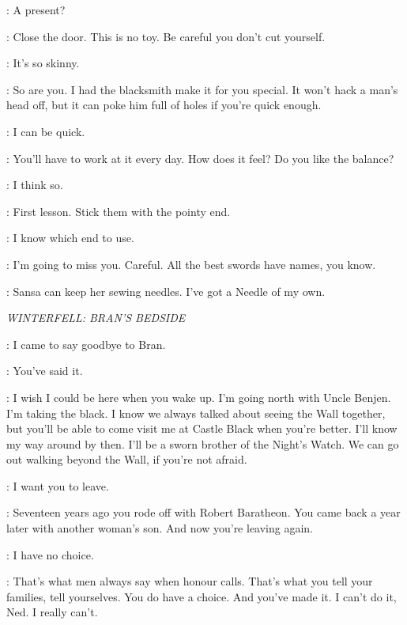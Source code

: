 \ARYA: A present? 

\JON: Close the door.  This is no toy. Be careful you don't cut yourself. 

\ARYA: It's so skinny. 

\JON: So are you. I had the blacksmith make it for you special. It won't hack a man's head off, but it can poke him full of holes if you're quick enough. 

\ARYA: I can be quick. 

\JON: You'll have to work at it every day. How does it feel? Do you like the balance? 

\ARYA: I think so. 

\JON: First lesson. Stick them with the pointy end. 

\ARYA: I know which end to use. 

\JON: I'm going to miss you.  Careful.  All the best swords have names, you know. 

\ARYA: Sansa can keep her sewing needles. I've got a Needle of my own. 

\scene

\textit{WINTERFELL: BRAN'S BEDSIDE}


\JON: I came to say goodbye to Bran. 

\CATELYN: You've said it. 

\JON: I wish I could be here when you wake up. I'm going north with Uncle Benjen. I'm taking the black. I know we always talked about seeing the Wall together, but you'll be able to come visit me at Castle Black when you're better. I'll know my way around by then. I'll be a sworn brother of the Night's Watch. We can go out walking beyond the Wall, if you're not afraid. 


\CATELYN: I want you to leave. 


\CATELYN: Seventeen years ago you rode off with Robert Baratheon. You came back a year later with another woman's son. And now you're leaving again. 

\NED: I have no choice. 

\CATELYN: That's what men always say when honour calls. That's what you tell your families, tell yourselves. You do have a choice. And you've made it. I can't do it, Ned. I really can't. 

